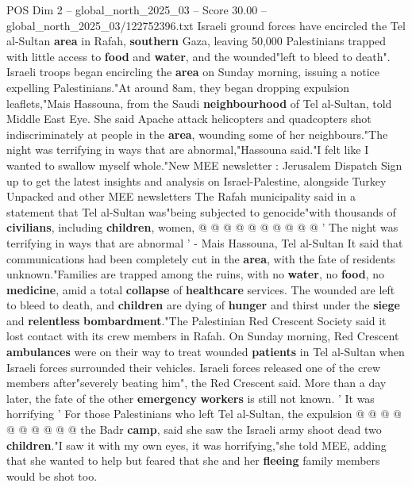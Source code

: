 \begin{textsample}{POS Dim 2 – global\_north\_2025\_03 – Score 30.00 – global\_north\_2025\_03/122752396.txt}  \label{ex:f2_pos_402}
Israeli ground forces have encircled the Tel al-Sultan \textbf{area} in Rafah, \textbf{southern} Gaza, leaving 50,000 Palestinians trapped with little access to \textbf{food} and \textbf{water}, and the wounded"left to bleed to death".
Israeli troops began encircling the \textbf{area} on Sunday morning, issuing a notice expelling Palestinians."At around 8am, they began dropping expulsion leaflets,"Mais Hassouna, from the Saudi \textbf{neighbourhood} of Tel al-Sultan, told Middle East Eye.
She said Apache attack helicopters and quadcopters shot indiscriminately at people in the \textbf{area}, wounding some of her neighbours."The night was terrifying in ways that are abnormal,"Hassouna said."I felt like I wanted to swallow myself whole."New MEE newsletter : Jerusalem Dispatch Sign up to get the latest insights and analysis on Israel-Palestine, alongside Turkey Unpacked and other MEE newsletters The Rafah municipality said in a statement that Tel al-Sultan was"being subjected to genocide"with thousands of \textbf{civilians}, including \textbf{children}, women, @ @ @ @ @ @ @ @ @ @ ' The night was terrifying in ways that are abnormal ' - Mais Hassouna, Tel al-Sultan It said that communications had been completely cut in the \textbf{area}, with the fate of residents unknown."Families are trapped among the ruins, with no \textbf{water}, no \textbf{food}, no \textbf{medicine}, amid a total \textbf{collapse} of \textbf{healthcare} services.
The wounded are left to bleed to death, and \textbf{children} are dying of \textbf{hunger} and thirst under the \textbf{siege} and \textbf{relentless} \textbf{bombardment}."The Palestinian Red Crescent Society said it lost contact with its crew members in Rafah.
On Sunday morning, Red Crescent \textbf{ambulances} were on their way to treat wounded \textbf{patients} in Tel al-Sultan when Israeli forces surrounded their vehicles.
Israeli forces released one of the crew members after"severely beating him", the Red Crescent said.
More than a day later, the fate of the other \textbf{emergency} \textbf{workers} is still not known. ' It was horrifying ' For those Palestinians who left Tel al-Sultan, the expulsion @ @ @ @ @ @ @ @ @ @ the Badr \textbf{camp}, said she saw the Israeli army shoot dead two \textbf{children}."I saw it with my own eyes, it was horrifying,"she told MEE, adding that she wanted to help but feared that she and her \textbf{fleeing} family members would be shot too.

\end{textsample}
